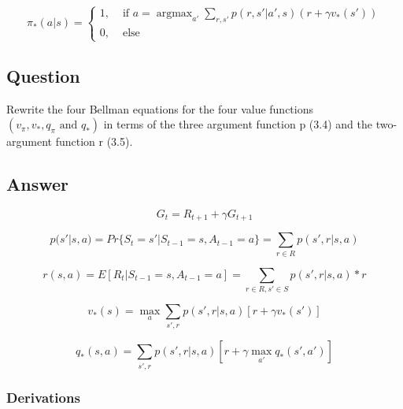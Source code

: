 \documentclass[11pt]{article}
\DeclareMathOperator*{\argmax}{argmax}
\begin{document}
    \begin{equation}
        \pi_*(a|s) =
        \begin{cases}
            1,& \text{ if } a = \argmax_{a'} \sum_{r,s'} p(r, s'| a', s)(r + \gamma v_*(s')) \\
            0,& \text{ else }
        \end{cases}
    \end{equation}

    \subsection{Question}

    Rewrite the four Bellman equations for the four value functions $ (v_\pi ,v_* , q_\pi \text{ and } q_* ) $ in terms of the three argument function p (3.4) and the two-argument function r (3.5).

    \subsection*{Answer}

    \begin{equation}
        G_t = R_{t+1} + \gamma G_{t+1}
    \end{equation}

    \begin{equation}
        p(s'|s,a) = Pr\{S_t=s'|S_{t-1}=s, A_{t-1}=a\} = \sum_{r \in R} p(s', r | s, a)
    \end{equation}

    \begin{equation}
        r(s,a) = E [R_t |S_{t-1}=s, A_{t-1}=a ] = \sum_{r \in R, s' \in S} p(s', r | s, a) * r
    \end{equation}

    \begin{equation}
        v_*(s) = \max_{a} \sum_{s',r} p(s',r| s, a) [r+\gamma v_*(s')]
    \end{equation}

     \begin{equation}
        q_*(s, a) = \sum_{s',r} p(s',r| s, a) [r+\gamma \max_{a'} q_*(s',a')]
    \end{equation}

    \subsubsection*{Derivations}
\end{document}
